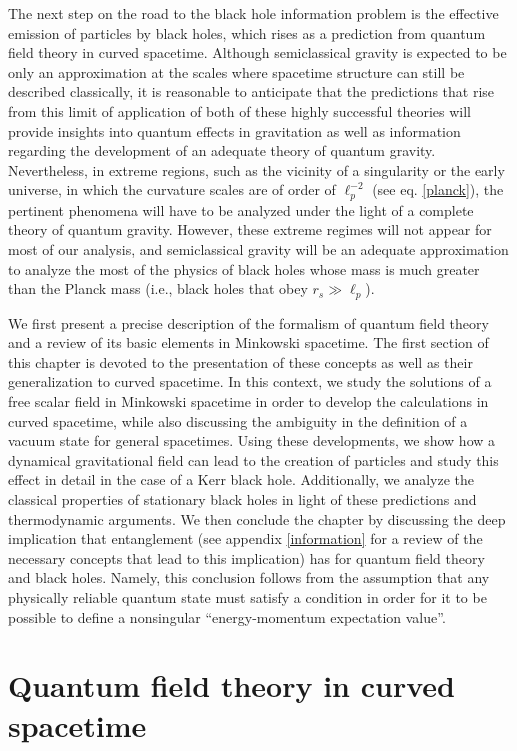 \documentclass[
12pt,		%
openright,	%
twoside,  %
a4paper,			%
chapter=TITLE,		%
english,			%
french,				%
spanish,			%
brazil				%
]{USPSC-classe/USPSC}
\begin{document}
The next step on the road to the black hole information problem is the effective emission of particles by black holes, which rises as a prediction from quantum field theory in curved spacetime. Although semiclassical gravity is expected to be only an approximation at the scales where spacetime structure can still be described classically, it is reasonable to anticipate that the predictions that rise from this limit of application of both of these highly successful theories will provide insights into quantum effects in gravitation as well as information regarding the development of an adequate theory of quantum gravity. Nevertheless, in extreme regions, such as the vicinity of a singularity or the early universe, in which the curvature scales are of order of $\ell_p^{-2}$ (see eq. \ref{planck}), the pertinent phenomena will have to be analyzed under the light of a complete theory of quantum gravity. However, these extreme regimes will not appear for most of our analysis, and semiclassical gravity will be an adequate approximation to analyze the most of the physics of black holes whose mass is much greater than the Planck mass (i.e., black holes that obey $r_s\gg\ell_p$).

We first present a precise description of the formalism of quantum field theory and a review of its basic elements in Minkowski spacetime. The first section of this chapter is devoted to the presentation of these concepts as well as their generalization to curved spacetime. In this context, we study the solutions of a free scalar field in Minkowski spacetime in order to develop the calculations in curved spacetime, while also discussing the ambiguity in the definition of a vacuum state for general spacetimes. Using these developments, we show how a dynamical gravitational field can lead to the creation of particles and study this effect in detail in the case of a Kerr black hole. Additionally, we analyze the classical properties of stationary black holes in light of these predictions and thermodynamic arguments. We then conclude the chapter by discussing the deep implication that entanglement (see appendix \ref{information} for a review of the necessary concepts that lead to this implication) has for quantum field theory and black holes. Namely, this conclusion follows from the assumption that any physically reliable quantum state must satisfy a condition in order for it to be possible to define a nonsingular ``energy-momentum expectation value''.


\section{Quantum field theory in curved spacetime}\label{qft}
\end{document}
